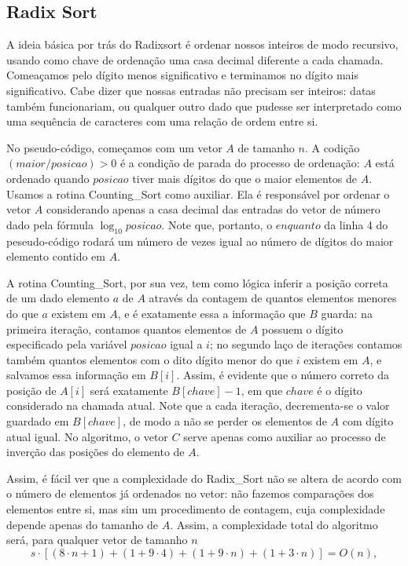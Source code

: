 \documentclass{article}
\begin{document}
\subsection{Radix Sort}
A ideia básica por trás do Radixsort é ordenar nossos inteiros de modo recursivo, usando como chave de ordenação uma casa decimal diferente a cada chamada. Comeaçamos pelo dígito menos significativo e terminamos no dígito mais significativo. Cabe dizer que nossas entradas não precisam ser inteiros: datas também funcionariam, ou qualquer outro dado que pudesse ser interpretado como uma sequência de caracteres com uma relação de ordem entre si.\par
%
No pseudo-código, começamos com um vetor $A$ de tamanho $n$. A codição $(maior/posicao)>0$ é a condição de parada do processo de ordenação: $A$ está ordenado quando $posicao$ tiver mais dígitos do que o maior elementos de $A$. Usamos a rotina Counting\_Sort como auxiliar. Ela é responsável por ordenar o vetor $A$ considerando apenas a casa decimal das entradas do vetor de número dado pela fórmula $\log_{10} posicao$. Note que, portanto, o $enquanto$ da linha 4 do peseudo-código rodará um número de vezes igual ao número de dígitos do maior elemento contido em $A$.\par
%
A rotina Counting\_Sort, por sua vez, tem como lógica inferir a posição correta de um dado elemento $a$ de $A$ através da contagem de quantos elementos menores do que $a$ existem em $A$, e é exatamente essa a informação que $B$ guarda: na primeira iteração, contamos quantos elementos de $A$ possuem o dígito especificado pela variável $posicao$ igual a $i$; no segundo laço de iterações contamos também quantos elementos com o dito dígito menor do que $i$ existem em $A$, e salvamos essa informação em $B[i]$. Assim, é evidente que o número correto da posição de $A[i]$ será exatamente $B[chave] - 1$, em que $chave$ é o dígito considerado na chamada atual. Note que a cada iteração, decrementa-se o valor guardado em $B[chave]$, de modo a não se perder os elementos de $A$ com dígito atual igual. No algoritmo, o vetor $C$ serve apenas como auxiliar ao processo de inverção das posições do elemento de $A$.\par
%
Assim, é fácil ver que a complexidade do Radix\_Sort não se altera de acordo com o número de elementos já ordenados no vetor: não fazemos comparações dos elementos entre si, mas sim um procedimento de contagem, cuja complexidade depende apenas do tamanho de $A$. Assim, a complexidade total do algoritmo será, para qualquer vetor de tamanho $n$ \[s\cdot\left[(8 \cdot n + 1) + (1 + 9\cdot4) + (1 + 9\cdot n) + (1 + 3\cdot n)\right] = O(n),\]
\end{document}
